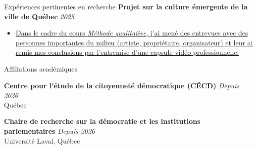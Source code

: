 \documentclass{resume} %
\begin{document}
\begin{rSection}{Expériences pertinentes en recherche}
{\bf Projet sur la culture émergente de la ville de Québec} \hfill {\em 2025}
\begin{itemize}
	\vspace{-0.1cm}\item {\href{https://youtu.be/sqIpJmnHXpI}{Dans le cadre du cours {\em Méthode qualitative}, j'ai mené des entrevues avec des personnes importantes du milieu (artiste, propriétaire, organisateur) et leur ai remis mes conclusions par l'entremise d'une capsule vidéo professionnelle.}}
\end{itemize}

\end{rSection}


\begin{rSection}{Affiliations académiques}

{\bf Centre pour l'étude de la citoyenneté démocratique (CÉCD)} \hfill {\em Depuis 2026}
\\ Québec

{\bf Chaire de recherche sur la démocratie et les institutions parlementaires} \hfill {\em Depuis 2026}
\\ Université Laval, Québec

\end{rSection}

\end{document}
